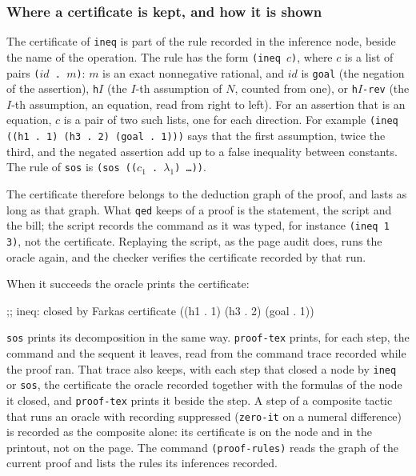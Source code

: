 \subsubsection*{Where a certificate is kept, and how it is shown}

The certificate of \texttt{ineq} is part of the rule recorded in the
inference node, beside the name of the operation.  The rule has the form
\texttt{(ineq $c$)}, where $c$ is a list of pairs
\texttt{($\mathit{id}$ .\ $m$)}: $m$ is an exact nonnegative rational,
and $\mathit{id}$ is \texttt{goal} (the negation of the assertion),
\texttt{h}$I$ (the $I$-th assumption of $N$, counted from one), or
\texttt{h}$I$\texttt{-rev} (the $I$-th assumption, an equation, read from
right to left).  For an assertion that is an equation, $c$ is a pair of
two such lists, one for each direction.  For example
\texttt{(ineq ((h1 .\ 1) (h3 .\ 2) (goal .\ 1)))} says that the first
assumption, twice the third, and the negated assertion add up to a
false inequality between constants.  The rule of \texttt{sos} is
\texttt{(sos (($c_1$ .\ $\lambda_1$) \ldots))}.

The certificate therefore belongs to the deduction graph of the proof,
and lasts as long as that graph.  What \texttt{qed} keeps of a proof is
the statement, the script and the bill; the script records the command
as it was typed, for instance \texttt{(ineq 1 3)}, not the certificate.
Replaying the script, as the page audit does, runs the oracle again, and
the checker verifies the certificate recorded by that run.

When it succeeds the oracle prints the certificate:
\begin{VNBcode}
;; ineq: closed by Farkas certificate ((h1 . 1) (h3 . 2) (goal . 1))
\end{VNBcode}
\texttt{sos} prints its decomposition in the same way.  \texttt{proof-tex}
prints, for each step, the command and the sequent it leaves, read from
the command trace recorded while the proof ran.  That trace also keeps, with each step that closed a node by \texttt{ineq} or
\texttt{sos}, the certificate the oracle recorded together with the
formulas of the node it closed, and \texttt{proof-tex} prints it beside the
step.  A step of a composite tactic that runs an oracle with recording
suppressed (\texttt{zero-it} on a numeral difference) is recorded as the
composite alone: its certificate is on the node and in the printout, not on
the page.  The command \texttt{(proof-rules)} reads the graph of the
current proof and lists the rules its inferences recorded.

